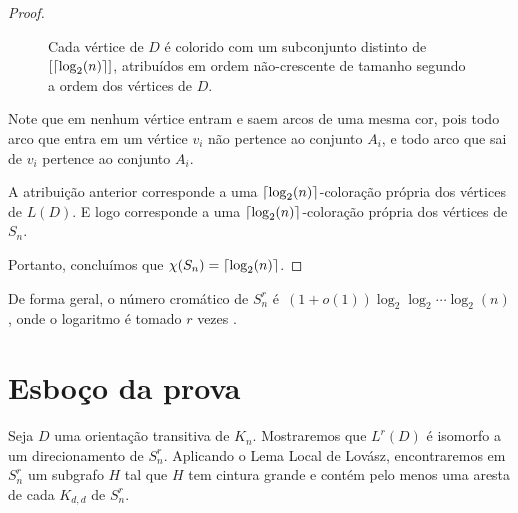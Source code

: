 \begin{proof}
\begin{figure}[H]
\centering
\caption{Cada vértice de $D$ é colorido com um subconjunto distinto de $[\lceil\log_2(n)\rceil]$, atribuídos em ordem não-crescente de tamanho segundo a ordem dos vértices de $D$.}
\label{fig:shiftchromaticsetcoloring}
\end{figure}

Note que em nenhum vértice entram e saem arcos de uma mesma cor, pois todo arco que entra em um vértice $v_i$ não pertence ao conjunto $A_i$, e todo arco que sai de $v_i$ pertence ao conjunto $A_i$.

A atribuição anterior corresponde a uma $\lceil\log_2(n)\rceil$-coloração própria dos vértices de $L(D)$. E logo corresponde a uma $\lceil\log_2(n)\rceil$-coloração própria dos vértices de $S_n$.

Portanto, concluímos que $\chi(S_n) = \lceil\log_2(n)\rceil$.
\end{proof}

De forma geral, o número cromático de $S_n^r$ é~$(1+o(1))\log_2 \log_2 \cdots \log_2 (n)$, onde o logaritmo é tomado $r$ vezes \cite{erdos1968chromatic}.


\section{Esboço da prova}

Seja $D$ uma orientação transitiva de $K_n$. Mostraremos que $L^r(D)$ é isomorfo a um direcionamento de $S_n^r$. Aplicando o Lema Local de Lovász, encontraremos em $S_n^r$ um subgrafo $H$ tal que $H$ tem cintura grande e contém pelo menos uma aresta de cada $K_{d,d}$ de $S_n^r$.

